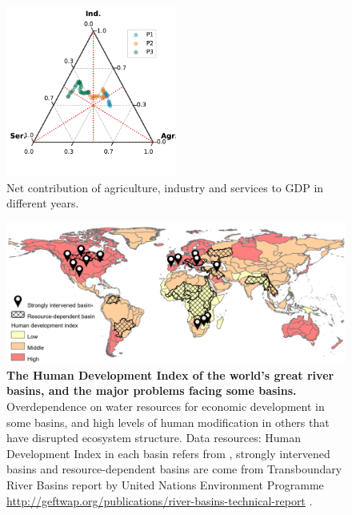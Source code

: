 \documentclass[9pt,twoside,lineno]{pnas-new}
\begin{document}
\begin{figure}
    \centering
    \includegraphics[width=0.5\textwidth]{../../figures/sup/ternary.pdf}
    \caption{Net contribution of agriculture, industry and services to GDP in different years.}
\end{figure}





\begin{figure}%
	\centering
	\includegraphics[width=\linewidth]{../../figures/main/map.pdf}
	\caption{
		\textbf{The Human Development Index of the world's great river basins, and the major problems facing some basins.}
		Overdependence on water resources for economic development in some basins, and high levels of human modification in others that have disrupted ecosystem structure. Data resources: Human Development Index in each basin refers from \cite{linkeGlobalHydroenvironmentalSubbasin2019}, strongly intervened basins and resource-dependent basins are come from Transboundary River Basins report by United Nations Environment Programme \url{http://geftwap.org/publications/river-basins-technical-report} \cite{unep-dhiTransboundaryRiverBasins2016}.
	}
	\label{fig:traps}
\end{figure}
\end{document}
